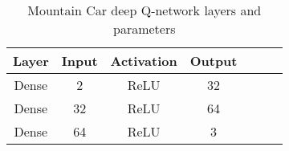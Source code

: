 \begin{table}[H]
  \centering
  \begin{tabular}{|c|c|c|c|c|c|c|}
    \hline
    \textbf{Layer} & \textbf{Input} & \textbf{Activation} & \textbf{Output} \\
    \hline
    Dense          & 2              & ReLU                & 32              \\
    Dense          & 32             & ReLU                & 64              \\
    Dense          & 64             & ReLU                & 3               \\
    \hline
  \end{tabular}
  \caption[Mountain Car DQN structure]{Mountain Car deep Q-network layers and parameters}
  \label{table:mountain_car_dqn}
\end{table}
